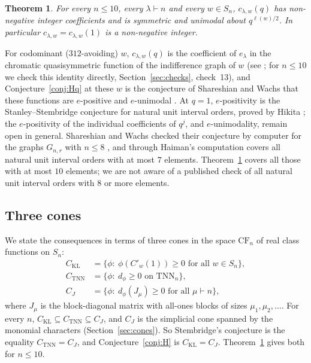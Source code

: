 \documentclass[11pt]{amsart}
\newtheorem{theorem}{Theorem}[section]
\theoremstyle{definition}
\theoremstyle{remark}
\newcommand{\TNN}{\mathrm{TNN}}
\newcommand{\CF}{\mathrm{CF}}
\newcommand{\CKL}{C_{\mathrm{KL}}}
\newcommand{\CTNN}{C_{\mathrm{TNN}}}
\newcommand{\CJ}{C_{J}}
\newcommand{\Cp}[1]{C'_{#1}(1)}
\begin{document}
\begin{theorem}\label{thm:main}
For every $n\le10$, every $\lambda\vdash n$ and every $w\in S_n$, $c_{\lambda,w}(q)$ has non-negative integer coefficients and is symmetric and unimodal about $q^{\ell(w)/2}$. In particular $c_{\lambda,w}=c_{\lambda,w}(1)$ is a non-negative integer.
\end{theorem}

For codominant ($312$-avoiding) $w$, $c_{\lambda,w}(q)$ is the coefficient of $e_\lambda$ in the chromatic quasisymmetric function of the indifference graph of $w$ (see \cite{CHSS,SW16}; for $n\le10$ we check this identity directly, Section~\ref{sec:checks}, check~13), and Conjecture~\ref{conj:Hq} at these $w$ is the conjecture of Shareshian and Wachs that these functions are $e$-positive and $e$-unimodal \cite[Conj.~5.1]{SW16}. At $q=1$, $e$-positivity is the Stanley--Stembridge conjecture for natural unit interval orders, proved by Hikita \cite{Hik}; the $e$-positivity of the individual coefficients of $q^j$, and $e$-unimodality, remain open in general. Shareshian and Wachs checked their conjecture by computer for the graphs $G_{n,r}$ with $n\le8$ \cite[\S5]{SW16}, and through \cite{CHSS} Haiman's computation \cite[\S4]{Hai} covers all natural unit interval orders with at most $7$ elements. Theorem~\ref{thm:main} covers all those with at most $10$ elements; we are not aware of a published check of all natural unit interval orders with $8$ or more elements.

\subsection*{Three cones}
We state the consequences in terms of three cones in the space $\CF_n$ of real class functions on $S_n$:
\begin{align*}
\CKL&=\{\phi:\ \phi(\Cp w)\ge0\text{ for all }w\in S_n\},\\
\CTNN&=\{\phi:\ d_\phi\ge0\text{ on }\TNN_n\},\\
\CJ&=\{\phi:\ d_\phi(J_\mu)\ge0\text{ for all }\mu\vdash n\},
\end{align*}
where $J_\mu$ is the block-diagonal matrix with all-ones blocks of sizes $\mu_1,\mu_2,\dots$. For every $n$, $\CKL\subseteq\CTNN\subseteq\CJ$, and $\CJ$ is the simplicial cone spanned by the monomial characters (Section~\ref{sec:cones}). So Stembridge's conjecture is the equality $\CTNN=\CJ$, and Conjecture~\ref{conj:H} is $\CKL=\CJ$. Theorem~\ref{thm:main} gives both for $n\le10$.
\end{document}
